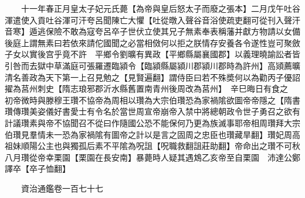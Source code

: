 　　十一年春正月皇太子妃元氏薨【為帝與皇后怒太子而廢之張本】二月戊午吐谷渾遣使入貢吐谷渾可汗夸呂聞陳亡大懼【吐從暾入聲谷音浴使疏吏翻可從刊入聲汗音寒】遁逃保險不敢為寇夸呂卒子世伏立使其兄子無素奉表稱藩并獻方物請以女備後庭上謂無素曰若依來請佗國聞之必當相傚何以拒之朕情存安養各令遂性豈可聚斂子女以實後宫乎竟不許　平鄉令劉曠有異政【平鄉縣屬襄國郡】以義理曉諭訟者皆引咎而去獄中草滿庭可張羅遷臨潁令【臨潁縣屬潁川郡潁川郡時為許州】高熲薦曠清名善政為天下第一上召見勉之【見賢遍翻】謂侍臣曰若不殊奬何以為勸丙子優詔擢為莒州刺史【隋志琅邪郡沂水縣舊置南青州後周改為莒州】　辛巳晦日有食之　初帝微時與滕穆王瓚不協帝為周相以瓚為大宗伯瓚恐為家禍隂欲圖帝帝隱之【隋書瓚傳瓚美姿儀好書愛士有令名於當世周宣帝崩帝入禁中將總朝政令世子勇召之欲有計議瓚素與帝不協聞召不從曰作隨國公恐不能保何乃更為族滅事耶帝相周瓚拜大宗伯瓚見羣情未一恐為家禍隂有圖帝之計以是言之固周之忠臣也瓚藏旱翻】瓚妃周高祖妹順陽公主也與獨孤后素不平隂為呪詛【呪職救翻詛莊助翻】帝命出之瓚不可秋八月瓚從帝幸栗園【栗園在長安南】暴薨時人疑其遇鴆乙亥帝至自栗園　沛達公鄭譯卒【卒子恤翻】

　　資治通鑑卷一百七十七


    


 


 



 

 
  







 


　　
　　
　
　
　


　　

　















	
	









































